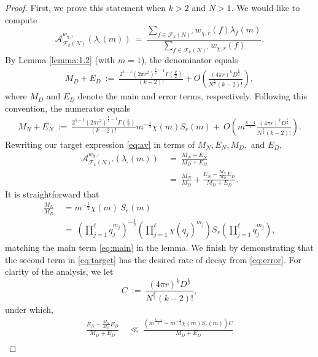 \documentclass[12pt, reqno,oneside]{amsart}
\theoremstyle{plain}
\theoremstyle{definition}
\theoremstyle{remark}
\theoremstyle{plain}
\numberwithin{equation}{section}
\begin{document}
\begin{proof}
First, we prove this statement when $k>2$ and $N>1$. We would like to compute 
\begin{equation}\label{eq:av}
\mathcal{A}^{w_{\chi,r}}_{\mathcal{F}_k(N)}(\lambda_\cdot(m)) \ = \ \frac{\sum_{f\in\mathcal{F}_k(N)'}w_{\chi,r}(f)\lambda_f(m)}{\sum_{f\in\mathcal{F}_k(N)'}w_{\chi,r}(f)}.
\end{equation}
By Lemma \ref{lemma:1.2} (with $m=1$), the denominator equals
\begin{align}
M_D+E_D \ := \ \frac{2^{k-1}(2\pi r^2)^{\frac{k}{2}-1}\Gamma\left(\frac{k}{2}\right)}{(k-2)!}+O\left(\frac{(4\pi r)^k D^{\frac{k}{2}}}{N^{\frac{k}{2}}(k-2)!}\right),  
\end{align}
where $M_D$ and $E_D$ denote the main and error terms, respectively. Following this convention, the numerator equals
\begin{align}
M_N+E_N \ := \ \frac{2^{k-1}(2\pi r^2)^{\frac{k}{2}-1}\Gamma\left(\frac{k}{2}\right)}{(k-2)!} m^{-\frac{1}{2}}\chi(m) S_r(m)+ \ O\left(m^{\frac{k-1}{2}}\frac{(4\pi r)^kD^{\frac{k}{2}}}{N^{\frac{k}{2}}(k-2)!}\right).
\end{align}
Rewriting our target expression \eqref{eq:av} in terms of $M_N,E_N,M_D,$ and $E_D$,
\begin{align}
\nonumber
\mathcal{A}^{w_{\chi,r}}_{\mathcal{F}_k(N)'}(\lambda_\cdot(m)) \ &= \ \frac{M_N+E_N}{M_D+E_D} \\
\label{eq:target}
&= \ \frac{M_N}{M_D}+\frac{E_N-\frac{M_N}{M_D}E_D}{M_D+E_D}.
\end{align}
It is straightforward that 
\begin{align}
\nonumber
\frac{M_N}{M_D} \ &= m^{-\frac{1}{2}}\chi(m) \ S_r(m) \\
&= \ \left(\prod\nolimits_{j=1}^\ell q_j^{m_j}\right)^{-\frac{1}{2}}\left(\prod\nolimits_{j=1}^\ell\chi(q_j)^{m_j}\right)S_r\left(\prod\nolimits_{j=1}^\ell q_j^{m_j}\right),
\end{align} 
matching the main term \eqref{eq:main} in the lemma. We finish by demonstrating that the second term in \eqref{eq:target} has the desired rate of decay from \eqref{eq:error}. For clarity of the analysis, we let \begin{equation}
C\ := \ \frac{(4\pi r)^kD^{\frac{k}{2}}}{N^{\frac{k}{2}}(k-2)!},    
\end{equation} 
under which,
\begin{align}
\nonumber
\frac{E_N-\frac{M_N}{M_D}E_D}{M_D+E_D} \ &\ll \ \frac{\left(m^{\frac{k-1}{2}}-m^{-\frac{1}{2}}\chi(m)S_r(m)\right)C}{M_D+E_D} \\

\end{align}
\end{proof}
\end{document}
